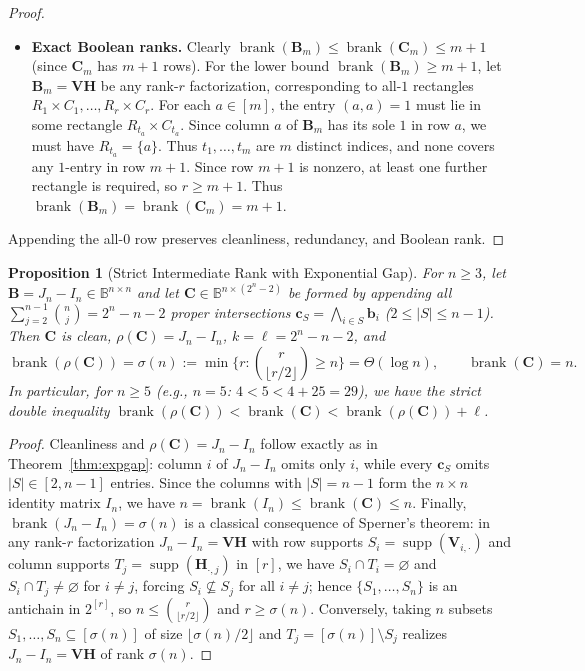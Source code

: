 \documentclass[11pt]{article}
\theoremstyle{plain}
\newtheorem{proposition}[theorem]{Proposition}
\theoremstyle{definition}
\theoremstyle{remark}
\DeclareMathOperator{\brank}{brank}
\DeclareMathOperator{\supp}{supp}
\begin{document}
\begin{proof}
\begin{itemize}[leftmargin=2em]
\item \textbf{Exact Boolean ranks.} Clearly $\brank(\mathbf{B}_m) \le \brank(\mathbf{C}_m) \le m + 1$ (since $\mathbf{C}_m$ has $m + 1$ rows). For the lower bound $\brank(\mathbf{B}_m) \ge m + 1$, let $\mathbf{B}_m = \mathbf{V}\mathbf{H}$ be any rank-$r$ factorization, corresponding to all-$1$ rectangles $R_1 \times C_1, \dots, R_r \times C_r$. For each $a \in [m]$, the entry $(a, a) = 1$ must lie in some rectangle $R_{t_a} \times C_{t_a}$. Since column $a$ of $\mathbf{B}_m$ has its sole $1$ in row $a$, we must have $R_{t_a} = \{a\}$. Thus $t_1, \dots, t_m$ are $m$ distinct indices, and none covers any $1$-entry in row $m+1$. Since row $m+1$ is nonzero, at least one further rectangle is required, so $r \ge m + 1$. Thus $\brank(\mathbf{B}_m) = \brank(\mathbf{C}_m) = m + 1$.
\end{itemize}
Appending the all-$0$ row preserves cleanliness, redundancy, and Boolean rank.
\end{proof}

\begin{proposition}[Strict Intermediate Rank with Exponential Gap]\label{prop:intermediate}
For $n \ge 3$, let $\mathbf{B} = J_n - I_n \in \mathbb{B}^{n \times n}$ and let $\mathbf{C} \in \mathbb{B}^{n \times (2^n - 2)}$ be formed by appending all $\sum_{j=2}^{n-1} \binom{n}{j} = 2^n - n - 2$ proper intersections $\mathbf{c}_S = \bigwedge_{i \in S} \mathbf{b}_i$ ($2 \le |S| \le n-1$). Then $\mathbf{C}$ is clean, $\rho(\mathbf{C}) = J_n - I_n$, $k = \ell = 2^n - n - 2$, and
\[
\brank(\rho(\mathbf{C})) = \sigma(n) := \min\biggl\{r : \binom{r}{\lfloor r/2 \rfloor} \ge n\biggr\} = \Theta(\log n), \qquad \brank(\mathbf{C}) = n.
\]
In particular, for $n \ge 5$ (e.g., $n = 5$: $4 < 5 < 4 + 25 = 29$), we have the strict double inequality $\brank(\rho(\mathbf{C})) < \brank(\mathbf{C}) < \brank(\rho(\mathbf{C})) + \ell$.
\end{proposition}

\begin{proof}
Cleanliness and $\rho(\mathbf{C}) = J_n - I_n$ follow exactly as in Theorem~\ref{thm:expgap}: column $i$ of $J_n - I_n$ omits only $i$, while every $\mathbf{c}_S$ omits $|S| \in [2, n-1]$ entries. Since the columns with $|S| = n - 1$ form the $n \times n$ identity matrix $I_n$, we have $n = \brank(I_n) \le \brank(\mathbf{C}) \le n$.
Finally, $\brank(J_n - I_n) = \sigma(n)$ is a classical consequence of Sperner's theorem: in any rank-$r$ factorization $J_n - I_n = \mathbf{V}\mathbf{H}$ with row supports $S_i = \supp(\mathbf{V}_{i,\cdot})$ and column supports $T_j = \supp(\mathbf{H}_{\cdot,j})$ in $[r]$, we have $S_i \cap T_i = \varnothing$ and $S_i \cap T_j \neq \varnothing$ for $i \neq j$, forcing $S_i \not\subseteq S_j$ for all $i \neq j$; hence $\{S_1, \dots, S_n\}$ is an antichain in $2^{[r]}$, so $n \le \binom{r}{\lfloor r/2 \rfloor}$ and $r \ge \sigma(n)$. Conversely, taking $n$ subsets $S_1, \dots, S_n \subseteq [\sigma(n)]$ of size $\lfloor \sigma(n)/2 \rfloor$ and $T_j = [\sigma(n)] \setminus S_j$ realizes $J_n - I_n = \mathbf{V}\mathbf{H}$ of rank $\sigma(n)$.
\end{proof}
\end{document}
